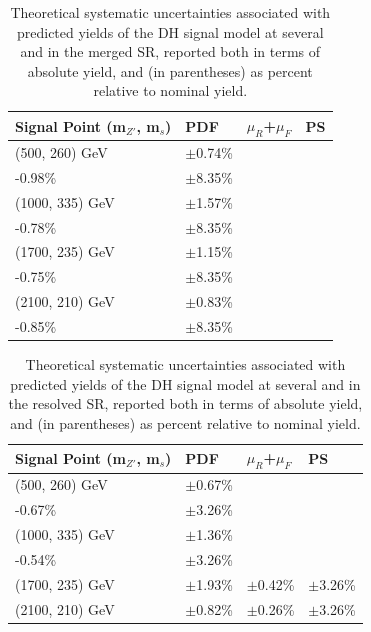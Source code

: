 \begin{table}[ht]
\begin{center}\small{
\caption{\label{tab:systs_sig_SR_mgd} Theoretical systematic uncertainties associated with predicted yields of the DH signal model at several \ms and \mZp in the merged SR, reported both in terms of absolute yield, and (in parentheses) as percent relative to nominal yield.}
\begin{tabular}{l l l l }
\toprule
\textbf{Signal Point (m\({_{Z'}}\), m\(_s\))} &\textbf{PDF} &\textbf{\(\mu_R\)+\(\mu_F\)} &\textbf{PS}\tabularnewline
\midrule
\midrule
(500, 260) GeV & \(\pm\)0.74\% & \(\substack{+0.95\%\\-0.98\%}\) & \(\pm\)8.35\% \tabularnewline
\midrule
(1000, 335) GeV & \(\pm\)1.57\% & \(\substack{+0.80\%\\-0.78\%}\) & \(\pm\)8.35\% \tabularnewline
\midrule
(1700, 235) GeV & \(\pm\)1.15\% & \(\substack{+0.71\%\\-0.75\%}\) & \(\pm\)8.35\% \tabularnewline
\midrule
(2100, 210) GeV & \(\pm\)0.83\% & \(\substack{+0.78\%\\-0.85\%}\) & \(\pm\)8.35\% \tabularnewline
\bottomrule
\end{tabular}
}
\end{center}
\end{table}

\begin{table}[ht]
\begin{center}\small{
\caption{\label{tab:systs_sig_SR_res} Theoretical systematic uncertainties associated with predicted yields of the DH signal model at several \ms and \mZp in the resolved SR, reported both in terms of absolute yield, and (in parentheses) as percent relative to nominal yield.}
\begin{tabular}{l l l l }
\toprule
\textbf{Signal Point (m\({_{Z'}}\), m\(_s\))} &\textbf{PDF} &\textbf{\(\mu_R\)+\(\mu_F\)} &\textbf{PS}\tabularnewline
\midrule
\midrule
(500, 260) GeV & \(\pm\)0.67\% & \(\substack{+0.68\%\\-0.67\%}\) & \(\pm\)3.26\% \tabularnewline
\midrule
(1000, 335) GeV & \(\pm\)1.36\% & \(\substack{+0.52\%\\-0.54\%}\) & \(\pm\)3.26\% \tabularnewline
\midrule
(1700, 235) GeV & \(\pm\)1.93\% & \(\pm\)0.42\% & \(\pm\)3.26\% \tabularnewline
\midrule
(2100, 210) GeV & \(\pm\)0.82\% & \(\pm\)0.26\% & \(\pm\)3.26\% \tabularnewline
\bottomrule
\end{tabular}
}
\end{center}
\end{table}

